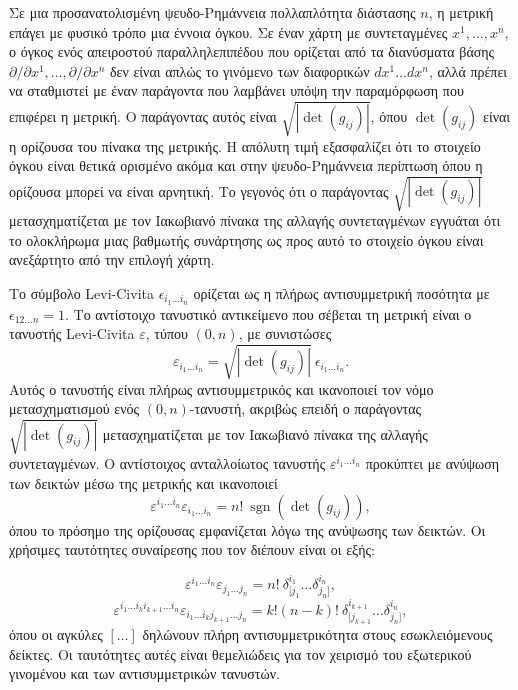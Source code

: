 \documentclass[12pt]{article}
\begin{document}
Σε μια προσανατολισμένη ψευδο-Ρημάννεια πολλαπλότητα διάστασης \( n \), η μετρική επάγει με φυσικό τρόπο μια έννοια όγκου. Σε έναν χάρτη με συντεταγμένες \( x^1, \dots, x^n \), ο όγκος ενός απειροστού παραλληλεπιπέδου που ορίζεται από τα διανύσματα βάσης \( \partial / \partial x^1, \dots, \partial / \partial x^n \) δεν είναι απλώς το γινόμενο των διαφορικών \( dx^1 \dots dx^n \), αλλά πρέπει να σταθμιστεί με έναν παράγοντα που λαμβάνει υπόψη την παραμόρφωση που επιφέρει η μετρική. Ο παράγοντας αυτός είναι \( \sqrt{|\det(g_{ij})|} \), όπου \( \det(g_{ij}) \) είναι η ορίζουσα του πίνακα της μετρικής. Η απόλυτη τιμή εξασφαλίζει ότι το στοιχείο όγκου είναι θετικά ορισμένο ακόμα και στην ψευδο-Ρημάννεια περίπτωση όπου η ορίζουσα μπορεί να είναι αρνητική. Το γεγονός ότι ο παράγοντας \( \sqrt{|\det(g_{ij})|} \) μετασχηματίζεται με τον Ιακωβιανό πίνακα της αλλαγής συντεταγμένων εγγυάται ότι το ολοκλήρωμα μιας βαθμωτής συνάρτησης ως προς αυτό το στοιχείο όγκου είναι ανεξάρτητο από την επιλογή χάρτη.

Το σύμβολο Levi-Civita \( \epsilon_{i_1 \dots i_n} \) ορίζεται ως η πλήρως αντισυμμετρική ποσότητα με \( \epsilon_{12 \dots n} = 1 \). Το αντίστοιχο τανυστικό αντικείμενο που σέβεται τη μετρική είναι ο τανυστής Levi-Civita \( \varepsilon \), τύπου \( (0,n) \), με συνιστώσες
\begin{equation}
\varepsilon_{i_1 \dots i_n} = \sqrt{|\det(g_{ij})|} \ \epsilon_{i_1 \dots i_n}. \tag{30}
\end{equation}
Αυτός ο τανυστής είναι πλήρως αντισυμμετρικός και ικανοποιεί τον νόμο μετασχηματισμού ενός \( (0,n) \)-τανυστή, ακριβώς επειδή ο παράγοντας \( \sqrt{|\det(g_{ij})|} \) μετασχηματίζεται με τον Ιακωβιανό πίνακα της αλλαγής συντεταγμένων. Ο αντίστοιχος ανταλλοίωτος τανυστής \( \varepsilon^{i_1 \dots i_n} \) προκύπτει με ανύψωση των δεικτών μέσω της μετρικής και ικανοποιεί
\begin{equation}
\varepsilon^{i_1 \dots i_n} \varepsilon_{i_1 \dots i_n} = n! \ \operatorname{sgn}(\det(g_{ij})), \tag{31}
\end{equation}
όπου το πρόσημο της ορίζουσας εμφανίζεται λόγω της ανύψωσης των δεικτών. Οι χρήσιμες ταυτότητες συναίρεσης που τον διέπουν είναι οι εξής:

\begin{equation}
\varepsilon^{i_1 \dots i_n} \varepsilon_{j_1 \dots j_n} = n! \ \delta^{i_1}_{[j_1} \dots \delta^{i_n}_{j_n]}, \tag{32}
\end{equation}
\begin{equation}
\varepsilon^{i_1 \dots i_k i_{k+1} \dots i_n} \varepsilon_{i_1 \dots i_k j_{k+1} \dots j_n} = k! (n-k)! \ \delta^{i_{k+1}}_{[j_{k+1}} \dots \delta^{i_n}_{j_n]}, \tag{33}
\end{equation}
όπου οι αγκύλες \( [\dots] \) δηλώνουν πλήρη αντισυμμετρικότητα στους εσωκλειόμενους δείκτες. Οι ταυτότητες αυτές είναι θεμελιώδεις για τον χειρισμό του εξωτερικού γινομένου και των αντισυμμετρικών τανυστών.
\end{document}
